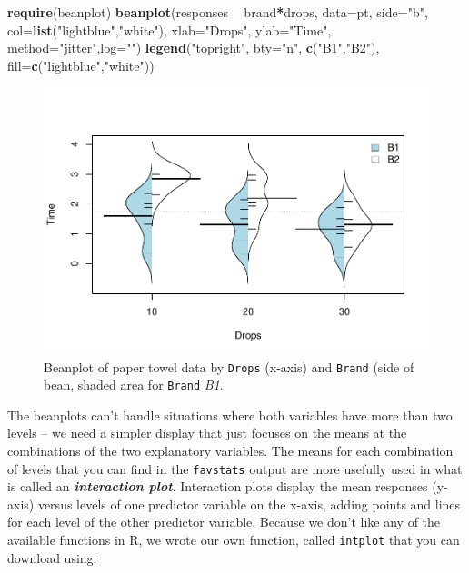 \documentclass[]{book}
\newenvironment{Shaded}{\begin{snugshade}}{\end{snugshade}}
\newcommand{\KeywordTok}[1]{\textcolor[rgb]{0.13,0.29,0.53}{\textbf{#1}}}
\newcommand{\DataTypeTok}[1]{\textcolor[rgb]{0.13,0.29,0.53}{#1}}
\newcommand{\StringTok}[1]{\textcolor[rgb]{0.31,0.60,0.02}{#1}}
\newcommand{\OperatorTok}[1]{\textcolor[rgb]{0.81,0.36,0.00}{\textbf{#1}}}
\newcommand{\NormalTok}[1]{#1}
\theoremstyle{definition}
\theoremstyle{definition}
\theoremstyle{remark}
\begin{document}
\begin{Shaded}
\begin{Highlighting}[]
\KeywordTok{require}\NormalTok{(beanplot)}
\KeywordTok{beanplot}\NormalTok{(responses }\OperatorTok{~}\StringTok{ }\NormalTok{brand}\OperatorTok{*}\NormalTok{drops, }\DataTypeTok{data=}\NormalTok{pt, }\DataTypeTok{side=}\StringTok{"b"}\NormalTok{, }\DataTypeTok{col=}\KeywordTok{list}\NormalTok{(}\StringTok{"lightblue"}\NormalTok{,}\StringTok{"white"}\NormalTok{),}
         \DataTypeTok{xlab=}\StringTok{"Drops"}\NormalTok{, }\DataTypeTok{ylab=}\StringTok{"Time"}\NormalTok{, }\DataTypeTok{method=}\StringTok{"jitter"}\NormalTok{,}\DataTypeTok{log=}\StringTok{""}\NormalTok{)}
\KeywordTok{legend}\NormalTok{(}\StringTok{"topright"}\NormalTok{, }\DataTypeTok{bty=}\StringTok{"n"}\NormalTok{, }\KeywordTok{c}\NormalTok{(}\StringTok{"B1"}\NormalTok{,}\StringTok{"B2"}\NormalTok{), }\DataTypeTok{fill=}\KeywordTok{c}\NormalTok{(}\StringTok{"lightblue"}\NormalTok{,}\StringTok{"white"}\NormalTok{))}
\end{Highlighting}
\end{Shaded}

\begin{figure}
\centering
\includegraphics{04-twoWayAnova_files/figure-latex/Figure4-1-1.pdf}
\caption{\label{fig:Figure4-1}Beanplot of paper towel data by \texttt{Drops} (x-axis) and
\texttt{Brand} (side of bean, shaded area for \texttt{Brand} \emph{B1}.}
\end{figure}

The beanplots can't handle situations where both variables have more
than two levels -- we need a simpler display that just focuses on the
means at the combinations of the two explanatory variables. The means
for each combination of levels that you can find in the
\texttt{favstats} output are more usefully used in what is called an
\textbf{\emph{interaction plot}}. Interaction plots display the mean
responses (y-axis) versus levels of one predictor variable on the
x-axis, adding points and lines for each level of the other predictor
variable. Because we don't like any of the available functions in R, we
wrote our own function, called \texttt{intplot} that you can download
using:
\end{document}
